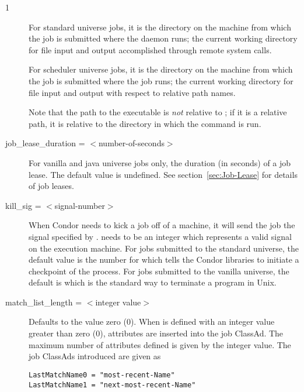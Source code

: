 \begin{ManPage}{\label{man-condor-submit}}{1}
\begin{description}
For standard universe jobs,
it is the directory on the machine from which the job is submitted
where the  daemon runs;
the current working directory for file input and output accomplished
through remote system calls.

For scheduler universe jobs,
it is the directory on the machine from which the job is submitted
where the job runs;
the current working directory for file input and output with
respect to relative path names.

Note that the path to the executable is \emph{not} relative to
; if it is a relative path, it is relative to the
directory in which the  command is run.


\item[job\_lease\_duration = $<$number-of-seconds$>$] For vanilla
and java universe jobs only, the duration (in seconds) of a
job lease.  The default value is undefined.
See section~\ref{sec:Job-Lease} for details of job leases.



\item[kill\_sig = $<$signal-number$>$] When Condor needs to kick a job
off of a machine, it will send the job the signal specified by
.   needs to be an integer which
represents a valid signal on the execution machine.  For jobs submitted
to the standard universe, the default value is the number for
\verb@SIGTSTP@ which tells the Condor libraries to initiate a checkpoint
of the process.  For jobs submitted to the vanilla universe,
the default 
is \verb@SIGTERM@ which is the standard way to terminate a program in Unix.  


\item[match\_list\_length = $<$integer value$>$]
Defaults to the value zero (0).
When  is defined with an integer value
greater than zero (0),
attributes are inserted into the job ClassAd.
The maximum number of attributes defined is given by the integer
value.
The job ClassAds introduced are given as
\begin{verbatim}
LastMatchName0 = "most-recent-Name"
LastMatchName1 = "next-most-recent-Name"
\end{verbatim}


\end{description}
\end{ManPage}
